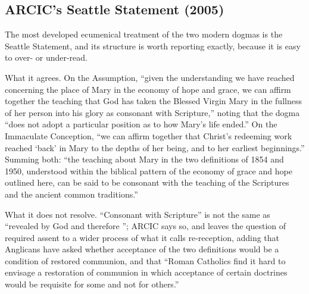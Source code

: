 \subsection*{ARCIC's Seattle Statement (2005)}

The most developed ecumenical treatment of the two modern dogmas is the
Seattle Statement, and its structure is worth reporting exactly, because
it is easy to over- or under-read.

What it agrees. On the Assumption, ``given the understanding we have
reached concerning the place of Mary in the economy of hope and grace, we
can affirm together the teaching that God has taken the Blessed Virgin
Mary in the fullness of her person into his glory as consonant with
Scripture,'' noting that the dogma ``does not adopt a particular position
as to how Mary's life ended.'' On the Immaculate Conception, ``we can
affirm together that Christ's redeeming work reached `back' in Mary to
the depths of her being, and to her earliest beginnings.'' Summing both:
``the teaching about Mary in the two definitions of 1854 and 1950,
understood within the biblical pattern of the economy of grace and hope
outlined here, can be said to be consonant with the teaching of the
Scriptures and the ancient common traditions.''

What it does not resolve. ``Consonant with Scripture'' is not the same as
``revealed by God and therefore ''; ARCIC says so, and
leaves the question of required assent to a wider process of what it
calls re-reception, adding that Anglicans have asked whether acceptance
of the two definitions would be a condition of restored communion, and
that ``Roman Catholics find it hard to envisage a restoration of
communion in which acceptance of certain doctrines would be requisite for
some and not for others.''

